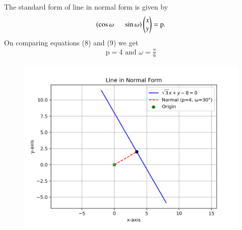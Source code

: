 \documentclass[journal]{IEEEtran}
\begin{document}
The standard form of line in normal form is given by 
\begin{align}
 \left(\cos{\omega}\hspace{0.5cm}\sin{\omega}\right)\begin{pmatrix}x\\y\end{pmatrix}=\text{p}.   
\end{align}
   On comparing equations (8) and (9) we get
   \begin{align}
       \text{p}=4 \text{ and }\omega=\frac{\pi}{6}
   \end{align}
   \begin{figure}[H]
    \centering
    \includegraphics[width=0.66\columnwidth]{figs/01.png}
    \label{fig-1}
\end{figure}
\end{document}

